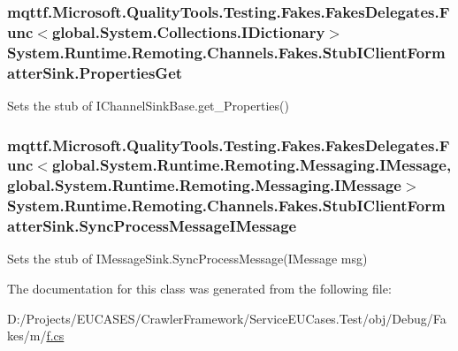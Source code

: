 \hypertarget{class_system_1_1_runtime_1_1_remoting_1_1_channels_1_1_fakes_1_1_stub_i_client_formatter_sink_a657112816d6a2a3d8cb41d228a84271a}{
\subsubsection[{Properties\-Get}]{\setlength{\rightskip}{0pt plus 5cm}mqttf.\-Microsoft.\-Quality\-Tools.\-Testing.\-Fakes.\-Fakes\-Delegates.\-Func$<$global.\-System.\-Collections.\-I\-Dictionary$>$ System.\-Runtime.\-Remoting.\-Channels.\-Fakes.\-Stub\-I\-Client\-Formatter\-Sink.\-Properties\-Get}}\label{class_system_1_1_runtime_1_1_remoting_1_1_channels_1_1_fakes_1_1_stub_i_client_formatter_sink_a657112816d6a2a3d8cb41d228a84271a}


Sets the stub of I\-Channel\-Sink\-Base.\-get\-\_\-\-Properties()

\hypertarget{class_system_1_1_runtime_1_1_remoting_1_1_channels_1_1_fakes_1_1_stub_i_client_formatter_sink_a22f1f882b561ca719fb7882fca5f94b7}{
\subsubsection[{Sync\-Process\-Message\-I\-Message}]{\setlength{\rightskip}{0pt plus 5cm}mqttf.\-Microsoft.\-Quality\-Tools.\-Testing.\-Fakes.\-Fakes\-Delegates.\-Func$<$global.\-System.\-Runtime.\-Remoting.\-Messaging.\-I\-Message, global.\-System.\-Runtime.\-Remoting.\-Messaging.\-I\-Message$>$ System.\-Runtime.\-Remoting.\-Channels.\-Fakes.\-Stub\-I\-Client\-Formatter\-Sink.\-Sync\-Process\-Message\-I\-Message}}\label{class_system_1_1_runtime_1_1_remoting_1_1_channels_1_1_fakes_1_1_stub_i_client_formatter_sink_a22f1f882b561ca719fb7882fca5f94b7}


Sets the stub of I\-Message\-Sink.\-Sync\-Process\-Message(\-I\-Message msg)



The documentation for this class was generated from the following file\-:\begin{DoxyCompactItemize}
\item 
D\-:/\-Projects/\-E\-U\-C\-A\-S\-E\-S/\-Crawler\-Framework/\-Service\-E\-U\-Cases.\-Test/obj/\-Debug/\-Fakes/m/\hyperlink{m_2f_8cs}{f.\-cs}\end{DoxyCompactItemize}
